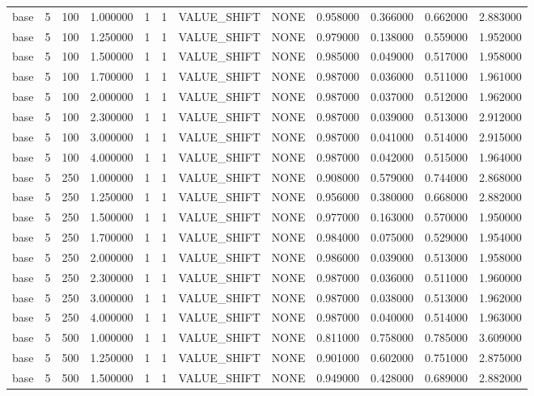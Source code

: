\begin{tabular}{lrrrllllrrrr}
base & 5 & 100 & 1.000000 & 1 & 1 & VALUE_SHIFT & NONE & 0.958000 & 0.366000 & 0.662000 & 2.883000 \\
base & 5 & 100 & 1.250000 & 1 & 1 & VALUE_SHIFT & NONE & 0.979000 & 0.138000 & 0.559000 & 1.952000 \\
base & 5 & 100 & 1.500000 & 1 & 1 & VALUE_SHIFT & NONE & 0.985000 & 0.049000 & 0.517000 & 1.958000 \\
base & 5 & 100 & 1.700000 & 1 & 1 & VALUE_SHIFT & NONE & 0.987000 & 0.036000 & 0.511000 & 1.961000 \\
base & 5 & 100 & 2.000000 & 1 & 1 & VALUE_SHIFT & NONE & 0.987000 & 0.037000 & 0.512000 & 1.962000 \\
base & 5 & 100 & 2.300000 & 1 & 1 & VALUE_SHIFT & NONE & 0.987000 & 0.039000 & 0.513000 & 2.912000 \\
base & 5 & 100 & 3.000000 & 1 & 1 & VALUE_SHIFT & NONE & 0.987000 & 0.041000 & 0.514000 & 2.915000 \\
base & 5 & 100 & 4.000000 & 1 & 1 & VALUE_SHIFT & NONE & 0.987000 & 0.042000 & 0.515000 & 1.964000 \\
base & 5 & 250 & 1.000000 & 1 & 1 & VALUE_SHIFT & NONE & 0.908000 & 0.579000 & 0.744000 & 2.868000 \\
base & 5 & 250 & 1.250000 & 1 & 1 & VALUE_SHIFT & NONE & 0.956000 & 0.380000 & 0.668000 & 2.882000 \\
base & 5 & 250 & 1.500000 & 1 & 1 & VALUE_SHIFT & NONE & 0.977000 & 0.163000 & 0.570000 & 1.950000 \\
base & 5 & 250 & 1.700000 & 1 & 1 & VALUE_SHIFT & NONE & 0.984000 & 0.075000 & 0.529000 & 1.954000 \\
base & 5 & 250 & 2.000000 & 1 & 1 & VALUE_SHIFT & NONE & 0.986000 & 0.039000 & 0.513000 & 1.958000 \\
base & 5 & 250 & 2.300000 & 1 & 1 & VALUE_SHIFT & NONE & 0.987000 & 0.036000 & 0.511000 & 1.960000 \\
base & 5 & 250 & 3.000000 & 1 & 1 & VALUE_SHIFT & NONE & 0.987000 & 0.038000 & 0.513000 & 1.962000 \\
base & 5 & 250 & 4.000000 & 1 & 1 & VALUE_SHIFT & NONE & 0.987000 & 0.040000 & 0.514000 & 1.963000 \\
base & 5 & 500 & 1.000000 & 1 & 1 & VALUE_SHIFT & NONE & 0.811000 & 0.758000 & 0.785000 & 3.609000 \\
base & 5 & 500 & 1.250000 & 1 & 1 & VALUE_SHIFT & NONE & 0.901000 & 0.602000 & 0.751000 & 2.875000 \\
base & 5 & 500 & 1.500000 & 1 & 1 & VALUE_SHIFT & NONE & 0.949000 & 0.428000 & 0.689000 & 2.882000 \\

\end{tabular}
